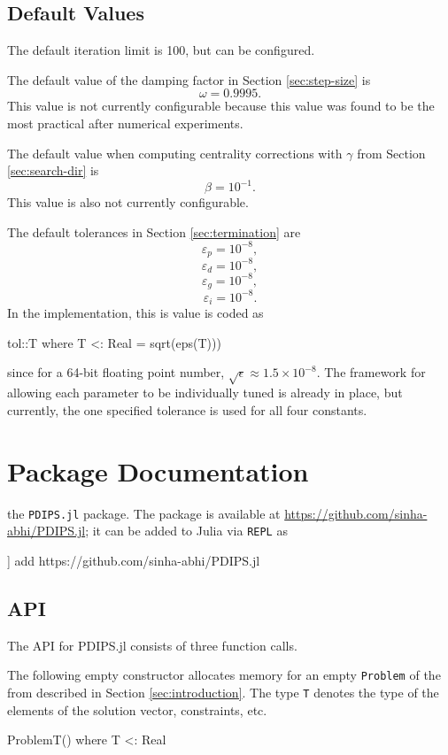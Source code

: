 \documentclass[titlepage]{abhi-tufte-handout}
\begin{document}
\subsection{Default Values}\label{sec:default-vals}
The default iteration limit is 100, but can be configured.

The default value of the damping factor in
Section \ref{sec:step-size} is
\[ \omega = 0.9995. \]
This value is not currently configurable because this value was found to be the
most practical after numerical experiments.\cite{XuHungYe1996}

The default value when computing centrality corrections with \(\gamma\) from
Section \ref{sec:search-dir} is
\[ \beta = 10^{-1}. \]
This value is also not currently configurable.

The default tolerances in Section \ref{sec:termination} are
\[ \varepsilon_p = 10^{-8}, \]
\[ \varepsilon_d = 10^{-8}, \]
\[ \varepsilon_g = 10^{-8}, \]
\[ \varepsilon_i = 10^{-8}. \]
In the implementation, this is value is coded as
\begin{dispjulia}
tol::T where T <: Real = sqrt(eps(T)))
\end{dispjulia}
since for a 64-bit floating point number,
\(\sqrt{\epsilon} \approx 1.5 \times 10^{-8}.\)
The framework for allowing each parameter to be
individually tuned is already in place, but currently, the one specified
tolerance is used for all four constants.

\section{Package Documentation}\label{sec:documentation}
 the \texttt{PDIPS.jl} package. The package
is available at \url{https://github.com/sinha-abhi/PDIPS.jl}; it can be added
to Julia via \texttt{REPL} as
\begin{dispjulia}
] add https://github.com/sinha-abhi/PDIPS.jl
\end{dispjulia}

\subsection{API}\label{sec:api}
The API for PDIPS.jl consists of three function calls.

The following empty constructor allocates memory for an empty \texttt{Problem}
of the from described in Section \ref{sec:introduction}.
The type \texttt{T} denotes the type of the elements of the solution vector,
constraints, etc.
\begin{dispjulia}
Problem{T}() where T <: Real
\end{dispjulia}
\end{document}
